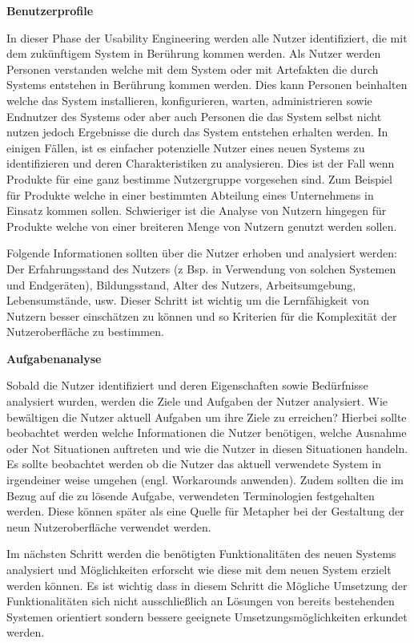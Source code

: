 \vspace{5mm}
\textbf{Benutzerprofile}\label{userprofile}  
 
\cite[S.~73]{Nielsen1994} In dieser Phase der Usability Engineering werden alle Nutzer identifiziert, die mit dem zukünftigem System in Berührung kommen werden. Als Nutzer werden Personen verstanden welche mit dem System oder mit Artefakten die durch Systems entstehen in Berührung kommen werden. Dies kann Personen beinhalten welche das System installieren, konfigurieren, warten, administrieren sowie Endnutzer
des Systems oder aber auch Personen die das System selbst nicht nutzen jedoch Ergebnisse die durch das System entstehen erhalten werden. In einigen Fällen, ist es einfacher potenzielle Nutzer eines neuen  Systems zu identifizieren und deren Charakteristiken zu analysieren. Dies ist der Fall wenn Produkte für eine ganz bestimme Nutzergruppe vorgesehen sind. 
Zum Beispiel für Produkte welche in einer bestimmten Abteilung eines Unternehmens in Einsatz kommen sollen. Schwieriger ist die Analyse von Nutzern hingegen für Produkte welche von einer breiteren Menge von Nutzern genutzt werden sollen. 

Folgende Informationen sollten über die Nutzer erhoben und analysiert werden: Der Erfahrungsstand des Nutzers (z Bsp. in Verwendung von solchen Systemen und Endgeräten), Bildungsstand, Alter des Nutzers, Arbeitsumgebung, Lebensumstände, usw. Dieser Schritt ist wichtig um die Lernfähigkeit von Nutzern besser einschätzen zu können und so Kriterien für die Komplexität der Nutzeroberfläche zu bestimmen.

\textbf{Aufgabenanalyse}\label{task_anlyse}  

\cite[S.~75]{Nielsen1994} Sobald die Nutzer identifiziert und deren Eigenschaften sowie Bedürfnisse analysiert wurden, werden die Ziele und Aufgaben der Nutzer analysiert. Wie bewältigen die Nutzer aktuell Aufgaben um ihre Ziele zu erreichen? Hierbei sollte beobachtet werden welche Informationen die Nutzer benötigen, welche Ausnahme oder Not Situationen auftreten und wie die Nutzer in diesen Situationen handeln. 
Es sollte beobachtet werden ob die Nutzer das aktuell verwendete System in irgendeiner weise umgehen (engl. Workarounds anwenden). Zudem sollten die im Bezug auf die zu lösende Aufgabe, verwendeten 
Terminologien festgehalten werden. Diese können später als eine Quelle für Metapher bei der Gestaltung der neun Nutzeroberfläche verwendet werden. 

\cite[S.~77]{Nielsen1994} Im nächsten Schritt werden die benötigten Funktionalitäten des neuen Systems analysiert und Möglichkeiten erforscht wie diese mit dem neuen System erzielt werden können. 
Es ist wichtig dass in diesem Schritt die Mögliche Umsetzung der Funktionalitäten sich nicht ausschließlich an Lösungen von bereits bestehenden Systemen orientiert sondern 
bessere geeignete Umsetzungsmöglichkeiten erkundet werden.

